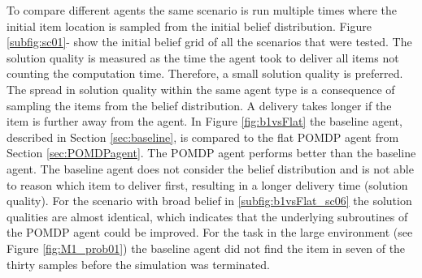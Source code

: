 To compare different agents the same scenario is run multiple times where the initial item location is sampled from the initial belief distribution. Figure \ref{subfig:sc01}- show the initial belief grid of all the scenarios that were tested.
The solution quality is measured as the time the agent took to deliver all items not counting the computation time. Therefore, a small solution quality is preferred. The spread in solution quality within the same agent type is a consequence of sampling the items from the belief distribution. A delivery takes longer if the item is further away from the agent. In Figure \ref{fig:b1vsFlat} the baseline agent, described in Section \ref{sec:baseline}, is compared to the flat POMDP agent from Section \ref{sec:POMDPagent}. The POMDP agent performs better than the baseline agent. The baseline agent does not consider the belief distribution and is not able to reason which item to deliver first, resulting in a longer delivery time (solution quality). For the scenario with broad belief in \ref{subfig:b1vsFlat_sc06} the solution qualities are almost identical, which indicates that the underlying subroutines of the POMDP agent could be improved. For the task in the large environment (see Figure \ref{fig:M1_prob01}) the baseline agent did not find the item in seven of the thirty samples before the simulation was terminated.\\

